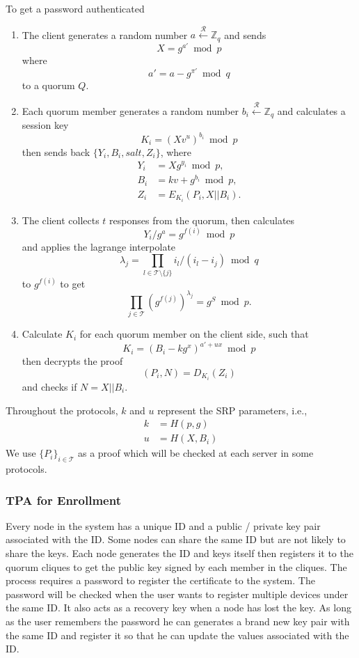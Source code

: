 To get a password authenticated
\begin{enumerate}
\item The client generates a random number
  $a \xleftarrow{\mathcal{R}} \mathbb{Z}_q$
  and sends
  \[
    X = g^{a'} \bmod p
  \]
  where
  \[
    a' = a - g^{\pi'} \bmod q
  \]
  to a quorum $Q$.
\item Each quorum member generates a random number
  $b_i \xleftarrow{\mathcal{R}} \mathbb{Z}_q$
  and calculates a session key
  \[ K_i = (Xv^u)^{b_i} \bmod p \]
  then sends back $\{Y_i, B_i, salt, Z_i\}$,
  where
  \begin{align*}
    Y_i &= X g^{y_i} \bmod p, \\
    B_i &= kv + g^{b_i} \bmod p, \\
    Z_i &= E_{K_i}(P_i, X ||B_i).
  \end{align*}
\item The client collects $t$ responses from the quorum, then
  calculates
  \[
    Y_i/g^a = g^{f(i)} \bmod p
  \]
  and applies the lagrange interpolate
  \[
    \lambda_j = \prod_{l \in \mathcal{T} \setminus \{j\}}
    i_l / (i_l - i_j) \bmod q
  \]
  to $g^{f(i)}$ 
  to get
  \[
    \prod_{j \in \mathcal{T}}(g^{f(j)})^{\lambda_j} = g^S \bmod p.
  \]
\item Calculate $K_i$ for each quorum member on the client side, such
  that
  \[
    K_i = (B_i - kg^x)^{a'+ux} \bmod p
  \]
  then decrypts the proof
  \[
    (P_i, N) = D_{K_i}(Z_i)
  \]
  and checks if $N = X||B_i$.
\end{enumerate}
Throughout the protocols, $k$ and $u$ represent the SRP parameters, i.e.,
\begin{align*}
  k &= H(p, g) \\
  u &= H(X, B_i)
\end{align*}
We use $\{P_i\}_{i \in \mathcal{T}}$ as a proof which will be
checked at each server in some protocols.

\subsubsection*{TPA for Enrollment}
Every node in the system has a unique ID and a public / private key
pair associated with the ID. Some nodes can share the same ID but are
not likely to share the keys. Each node generates the ID and keys
itself then registers it to the quorum cliques to get the public key
signed by each member in the cliques. The process requires a password
to register the certificate to the system. The password will be checked
when the user wants to register multiple devices under the
same ID. It also acts as a recovery key when a node has lost the
key. As long as the user remembers the password he can generates a
brand new key pair with the same ID and register it so that he can
update the values associated with the ID.\\

